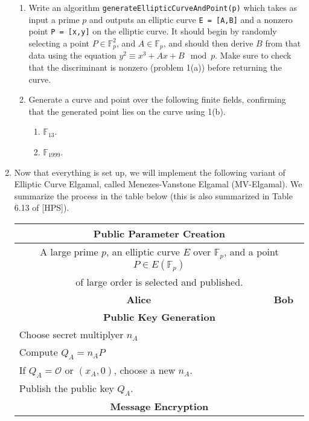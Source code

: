 \documentclass[11pt]{article}
\newcommand{\bF}{\mathbb{F}}
\newcommand{\cO}{\mathcal{O}}
\begin{document}
\begin{enumerate}
{  \begin{enumerate}
    \item{
    Write an algorithm \verb|generateEllipticCurveAndPoint(p)| which takes as input a prime $p$ and outputs an elliptic curve \verb|E = [A,B]| and a nonzero point \verb|P = [x,y]| on the elliptic curve.  It should begin by randomly selecting a point $P\in\bF_p^2$, and $A\in\bF_p$, and should then derive $B$ from that data using the equation $y^2\equiv x^3+Ax+B\mod p$.  Make sure to check that the discriminant is nonzero (problem 1(a)) before returning the curve.
    }
    \item{
    Generate a curve and point over the following finite fields, confirming that the generated point lies on the curve using 1(b).
    \begin{enumerate}
      \item{$\bF_{13}$.}
      \item{$\bF_{1999}$.}
    \end{enumerate}
    }
  \end{enumerate}
  }
  \item{
  Now that everything is set up, we will implement the following variant of Elliptic Curve Elgamal, called Menezes-Vanstone Elgamal (MV-Elgamal).  We summarize the process in the table below (this is also summarized in Table 6.13 of [HPS]).
  \begin{center}
    \begin{tabular}{|l|l|}
      \hline
      \multicolumn{2}{|c|}{\textbf{Public Parameter Creation}}\\
      \hline
      \multicolumn{2}{|c|}{A large prime $p$, an elliptic curve $E$ over $\bF_p$, and a point $P\in E(\bF_p)$}\\
      \multicolumn{2}{|c|}{of large order is selected and published.}\\
      \hline
      \multicolumn{1}{|c|}{\textbf{Alice}} & \multicolumn{1}{|c|}{\textbf{Bob}}\\
      \hline
      \multicolumn{2}{|c|}{\textbf{Public Key Generation}}\\
      \hline
      Choose secret multiplyer $n_A$ & \\
      Compute $Q_A = n_AP$ & \\
      If $Q_A=\cO$ or $(x_A,0)$, choose a new $n_A$. & \\
      Publish the public key $Q_A$. & \\
      \hline
      \multicolumn{2}{|c|}{\textbf{Message Encryption}}\\

\end{tabular}
\end{center}}
\end{enumerate}
\end{document}
